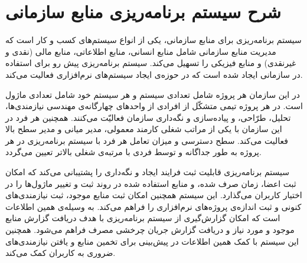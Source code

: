 \section{شرح سیستم برنامه‌ریزی منابع سازمانی}
سیستم برنامه‌ریزی برای منابع سازمانی، یکی از انواع سیستم‌های کسب و کار است که مدیریت منابع سازمانی شامل منابع انسانی، منابع اطلاعاتی، منابع مالی (نقدی و غیرنقدی) و منابع فیزیکی را تسهیل می‌کند. سیستم برنامه‌ریزی پیش رو برای استفاده در سازمانی ایجاد شده است که در حوزه‌ی ایجاد سیستم‌های نرم‌افزاری فعالیت می‌کند. \par
در این سازمان هر پروژه شامل تعدادی سیستم و هر سیستم خود شامل تعدادی ماژول است. در هر پروژه تیمی متشکّل از افرادی از واحدهای چهارگانه‌ی مهندسی نیازمندی‌ها، تحلیل، طرّاحی، و پیاده‌سازی و نگه‌داری سازمان فعالیّت می‌کنند. همچنین هر فرد در این سازمان با یکی از مراتب شغلی کارمند معمولی، مدیر میانی و مدیر سطح بالا فعالیت می‌کند. سطح دسترسی و میزان تعامل هر فرد با سیستم برنامه‌ریزی در هر پروژه به طور جداگانه و توسط فردی با مرتبه‌ی شغلی بالاتر تعیین می‌گردد. \par
سیستم برنامه‌ریزی قابلیت ثبت فرایند ایجاد و نگه‌داری را پشتیبانی می‌کند که امکان ثبت اعضا، زمان صرف شده، و منابع استفاده شده در روند ثبت و تغییر ماژول‌ها را در اختیار کاربران می‌گذارد. این سیستم همچنین امکان ثبت منابع موجود، ثبت نیازمندی‌های کنونی و ثبت اندازه‌ی پروژه‌های نرم‌افزاری را فراهم می‌کند. به وسیله‌ی همین اطلاعات است که امکان گزارش‌گیری از سیستم برنامه‌ریزی با هدف دریافت گزارش منابع موجود و مورد نیاز و دریافت گزارش جریان چرخشی مصرف فراهم می‌شود. همچنین این سیستم با کمک همین اطلاعات در پیش‌بینی برای تخمین منابع و یافتن نیازمندی‌های ضروری به کاربران کمک می‌کند. \par

